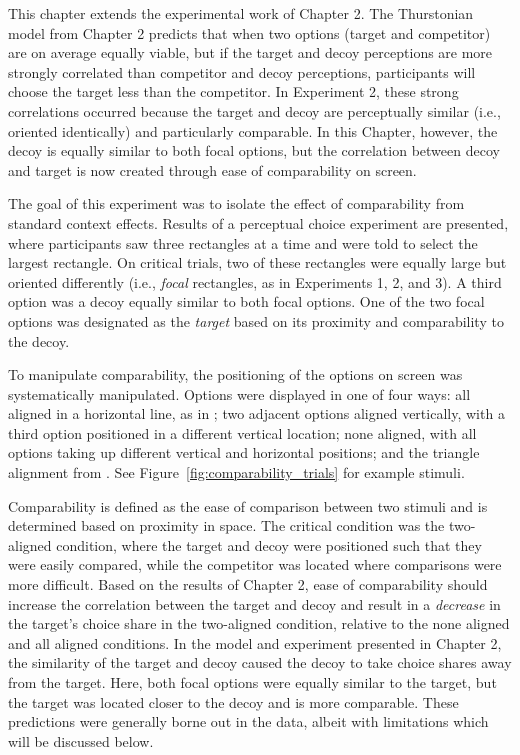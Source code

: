 This chapter extends the experimental work of Chapter 2. The Thurstonian model from Chapter 2 predicts that when two options (target and competitor) are on average equally viable, but if the target and decoy perceptions are more strongly correlated than competitor and decoy perceptions, participants will choose the target less than the competitor. In Experiment 2, these strong correlations occurred because the target and decoy are perceptually similar (i.e., oriented identically) and particularly comparable. In this Chapter, however, the decoy is equally similar to both focal options, but the correlation between decoy and target is now created through ease of comparability on screen.

The goal of this experiment was to isolate the effect of comparability from standard context effects. Results of a perceptual choice experiment are presented, where participants saw three rectangles at a time and were told to select the largest rectangle. On critical trials, two of these rectangles were equally large but oriented differently (i.e., \textit{focal} rectangles, as in Experiments 1, 2, and 3). A third option was a decoy equally similar to both focal options. One of the two focal options was designated as the \textit{target} based on its proximity and comparability to the decoy. 

To manipulate comparability, the positioning of the options on screen was systematically manipulated. Options were displayed in one of four ways: all aligned in a horizontal line, as in \textcite{trueblood2013not}; two adjacent options aligned vertically, with a third option positioned in a different vertical location; none aligned, with all options taking up different vertical and horizontal positions; and the triangle alignment from \textcite{spektorWhenGoodLooks2018b}. See Figure~\ref{fig:comparability_trials} for example stimuli.

Comparability is defined as the ease of comparison between two stimuli and is determined based on proximity in space. The critical condition was the two-aligned condition, where the target and decoy were positioned such that they were easily compared, while the competitor was located where comparisons were more difficult. Based on the results of Chapter 2, ease of comparability should increase the correlation between the target and decoy and result in a \textit{decrease} in the target's choice share in the two-aligned condition, relative to the none aligned and all aligned conditions. In the model and experiment presented in Chapter 2, the similarity of the target and decoy caused the decoy to take choice shares away from the target. Here, both focal options were equally similar to the target, but the target was located closer to the decoy and is more comparable. These predictions were generally borne out in the data, albeit with limitations which will be discussed below.

